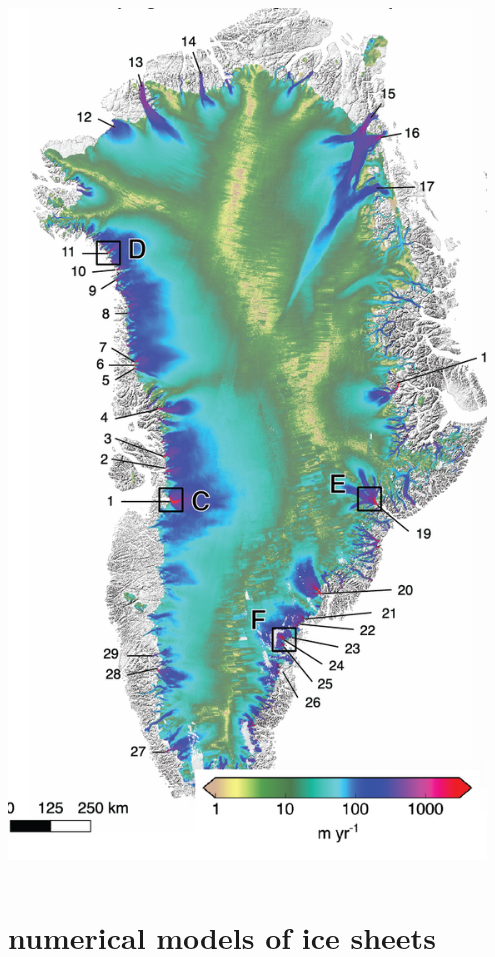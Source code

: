 \documentclass[10pt,hyperref={pdfpagelabels=true}]{beamer}
\begin{document}
\begin{frame}
\begin{columns}
\begin{column}{0.4\textwidth}
\hfill \includegraphics[width=0.95\textwidth]{greenland-overview-obsonly}
\end{column}
\end{columns}
\end{frame}


\section[numerical models]{numerical models of ice sheets}
\end{document}
